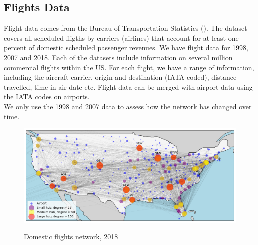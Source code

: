 
\subsection{Flights Data}
\label{subsec:Flight_Data}
Flight data comes from the Bureau of Transportation Statistics (\citet{BTS}). The dataset covers all scheduled fligths by carriers (airlines) that account for at least one percent of domestic scheduled passenger revenues. We have flight data for 1998, 2007 and 2018. Each of the datasets include information on several million commercial flights within the US. For each flight, we have a range of information, including the aircraft carrier, origin and destination (IATA coded), distance travelled, time in air date etc. Flight data can be merged with airport data using the IATA codes on airports. \medskip\\
We only use the 1998 and 2007 data to assess how the network has changed over time.



\begin{figure}[H]
  \centering
  \caption{Domestic flights network, 2018}
    \includegraphics[width=1. \textwidth]{Exam/Figures/map_general_18}
    \vspace{-0.7cm}
  \label{fig:map_general_18}
\end{figure}

